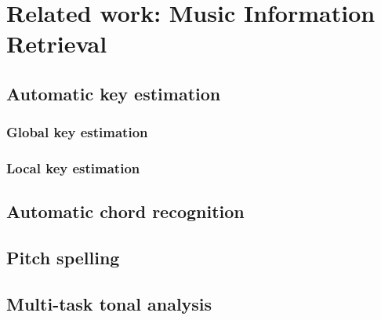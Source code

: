 \chapter{Related work: Music Information Retrieval}
\label{chap:chap2}


\section{Automatic key estimation}
\subsection{Global key estimation}
\subsection{Local key estimation}

\section{Automatic chord recognition}
\section{Pitch spelling}
\section{Multi-task tonal analysis}


